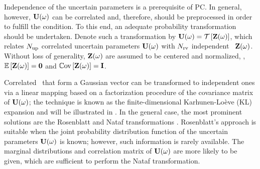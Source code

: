 Independence of the uncertain parameters is a prerequisite of PC. In general, however, $\mathbf{U}(\omega)$ can be correlated and, therefore, should be preprocessed in order to fulfill the condition. To this end, an adequate probability transformation should be undertaken. Denote such a transformation by $\vU(\o) = \oTransform{\vZ(\o)}$, which relates ${N_\text{up}}$ correlated uncertain parameters $\mathbf{U}(\omega)$ with ${N_\text{rv}}$ independent \rvs\ $\mathbf{Z}(\omega)$. Without loss of generality, $\mathbf{Z}(\omega)$ are assumed to be centered and normalized, \ie, $\oExp{\vZ(\o)} = \mZero$ and $\oCov{\vZ(\o)} = \mI$.

Correlated \rvs\ that form a Gaussian vector can be transformed to independent ones via a linear mapping based on a factorization procedure of the covariance matrix of $\mathbf{U}(\omega)$; the technique is known as the finite-dimensional Karhunen-Lo\`{e}ve (KL) expansion and will be illustrated in . In the general case, the most prominent solutions are the Rosenblatt and Nataf transformations \cite{eldred2009}. Rosenblatt's approach is suitable when the joint probability distribution function of the uncertain parameters $\mathbf{U}(\omega)$ is known; however, such information is rarely available. The marginal distributions and correlation matrix of $\mathbf{U}(\omega)$ are more likely to be given, which are sufficient to perform the Nataf transformation.
